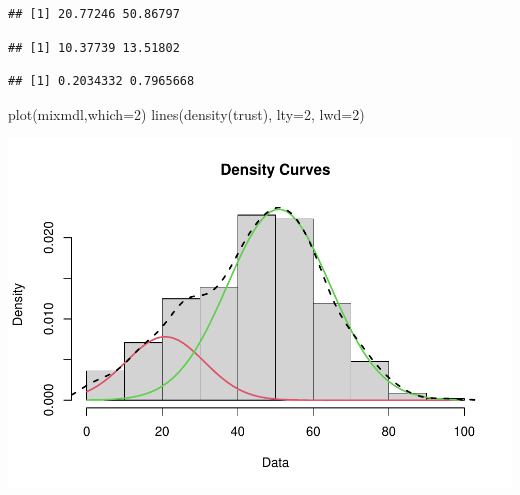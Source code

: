 \documentclass[
]{book}
\newenvironment{Shaded}{\begin{snugshade}}{\end{snugshade}}
\newcommand{\AttributeTok}[1]{\textcolor[rgb]{0.77,0.63,0.00}{#1}}
\newcommand{\DecValTok}[1]{\textcolor[rgb]{0.00,0.00,0.81}{#1}}
\newcommand{\FunctionTok}[1]{\textcolor[rgb]{0.00,0.00,0.00}{#1}}
\newcommand{\NormalTok}[1]{#1}
\newcommand{\SpecialCharTok}[1]{\textcolor[rgb]{0.00,0.00,0.00}{#1}}
\begin{document}
\begin{Shaded}
\end{Shaded}

\begin{verbatim}
## [1] 20.77246 50.86797
\end{verbatim}

\begin{Shaded}
\end{Shaded}

\begin{verbatim}
## [1] 10.37739 13.51802
\end{verbatim}

\begin{Shaded}
\end{Shaded}

\begin{verbatim}
## [1] 0.2034332 0.7965668
\end{verbatim}

\begin{Shaded}
\begin{Highlighting}[]
\FunctionTok{plot}\NormalTok{(mixmdl,}\AttributeTok{which=}\DecValTok{2}\NormalTok{)}
\FunctionTok{lines}\NormalTok{(}\FunctionTok{density}\NormalTok{(trust), }\AttributeTok{lty=}\DecValTok{2}\NormalTok{, }\AttributeTok{lwd=}\DecValTok{2}\NormalTok{)}
\end{Highlighting}
\end{Shaded}

\includegraphics{bookdown-demo_files/figure-latex/307-2.pdf}
\end{document}

